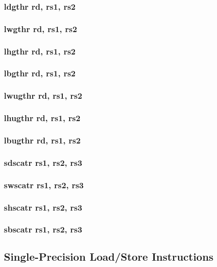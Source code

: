 \documentclass{article}
\begin{document}
\subsubsection{ldgthr rd, rs1, rs2}
\subsubsection{lwgthr rd, rs1, rs2}
\subsubsection{lhgthr rd, rs1, rs2}
\subsubsection{lbgthr rd, rs1, rs2}
\subsubsection{lwugthr rd, rs1, rs2}
\subsubsection{lhugthr rd, rs1, rs2}
\subsubsection{lbugthr rd, rs1, rs2}

\subsubsection{sdscatr rs1, rs2, rs3}
\subsubsection{swscatr rs1, rs2, rs3}
\subsubsection{shscatr rs1, rs2, rs3}
\subsubsection{sbscatr rs1, rs2, rs3}

\subsection{Single-Precision Load/Store Instructions}
\end{document}
